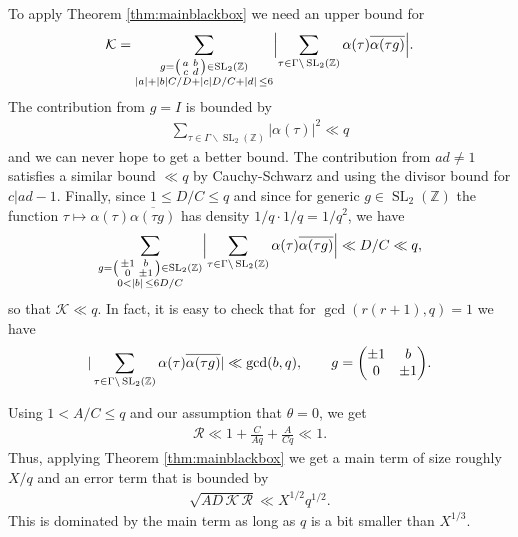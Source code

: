 \documentclass[12pt]{amsart}
\theoremstyle{definition}
\theoremstyle{remark}
\numberwithin{equation}{section}
\newcommand{\Z}{{\mathbb Z}}
\newcommand{\1}{{\mathbf 1}}
\newcommand{\SL}{\operatorname{SL}_2}
\renewcommand{\c}{\mathfrak c}
\begin{document}
To apply Theorem \ref{thm:mainblackbox} we need an upper bound for
\begin{align*}
  \mathcal{K} =   \sum_{\substack{g =\smqty(a & b \\c & d) \in \SL(\Z) \\  |a|+|b|C/D+|c|D/C+|d| \,\leq 6}}\Bigl|\sum_{ \substack{\tau\in \Gamma \backslash  \SL(\Z) 
 }} \alpha(\tau) \overline{\alpha(\tau g)} \Bigr|.
\end{align*}
The contribution from $g = I$ is bounded by
\begin{align*}
    \sum_{\tau \in \Gamma \backslash  \SL(\Z) } |\alpha(\tau)|^2 \ll q 
\end{align*}
and we can never hope to get a better bound. The contribution from $ad \neq 1$ satisfies a similar bound $\ll q$ by Cauchy-Schwarz and using the divisor bound for $c |ad-1$. Finally, since $1 \leq D/C \leq q$ and since for generic $g \in \SL(\Z)$ the function $\tau \mapsto \alpha(\tau) \overline{\alpha(\tau g)}$ has density $1/q \cdot 1/q = 1/q^2$, we have
\begin{align*}
    \sum_{\substack{g =\smqty(\pm 1 & b \\0 & \pm 1) \in \SL(\Z) \\ 0< |b| \,\leq 6 D/C}}\Bigl|\sum_{ \substack{\tau\in \Gamma \backslash  \SL(\Z) 
 }} \alpha(\tau) \overline{\alpha(\tau g)} \Bigr| \ll  D/C \ll  q,
\end{align*}
so that $\mathcal{K} \ll  q$. In fact, it is easy to check that for $\gcd(r(r+1),q)=1$ we have  
\begin{align*}
    |\sum_{ \substack{\tau\in \Gamma \backslash  \SL(\Z) 
 }} \alpha(\tau) \overline{\alpha(\tau g)} |  \ll \gcd(b,q), \quad \quad g =\mqty(\pm 1 & b \\0 & \pm 1).
\end{align*}

Using $1 <A/C \leq q$ and our assumption that  $\theta=0$, we get
\begin{align*}
    \mathcal{ R} \ll 1 + \frac{C}{Aq} + \frac{A}{Cq} \ll 1.
\end{align*}
Thus, applying Theorem \ref{thm:mainblackbox} we get a main term of size roughly $X/q$ and an error term that is bounded by
\begin{align*}
    \sqrt{AD \, \mathcal{K} \, \mathcal{R}} \ll X^{1/2} q^{1/2}.
\end{align*}
This is dominated by the main term as long as $q$ is a bit smaller than $X^{1/3}$.
\end{document}
